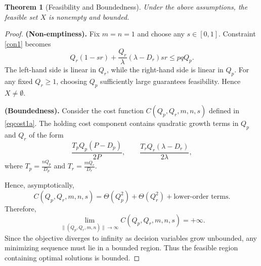 \documentclass[10pt,a4paper]{amsart}
\newtheorem{theorem}{Theorem}
\begin{document}
\begin{theorem}[Feasibility and Boundedness]\label{theorem1}
Under the above assumptions, the feasible set $X$ is nonempty and bounded.
\end{theorem}

\begin{proof}
\textbf{(Non-emptiness).}
Fix $m=n=1$ and choose any $s\in[0,1]$.
Constraint \eqref{con1} becomes
\[
Q_r(1-sr) + \frac{Q_r}{\lambda}(\lambda-D_r)sr \le pqQ_p.
\]
The left-hand side is linear in $Q_r$, while the right-hand side
is linear in $Q_p$. For any fixed $Q_r\ge1$, choosing $Q_p$
sufficiently large guarantees feasibility. Hence $X\neq\emptyset$.

\medskip

\textbf{(Boundedness).}
Consider the cost function $C(Q_p,Q_r,m,n,s)$ defined in \eqref{eqcost1a}.
The holding cost component contains quadratic growth terms in $Q_p$
and $Q_r$ of the form
\[
\frac{T_pQ_p(P-D_p)}{2P}, \qquad
\frac{T_rQ_r(\lambda-D_r)}{2\lambda},
\]
where $T_p = \frac{nQ_p}{D_p}$ and $T_r = \frac{mQ_r}{D_r}$.

Hence, asymptotically,
\[
C(Q_p,Q_r,m,n,s)
= \Theta(Q_p^2) + \Theta(Q_r^2) + \text{lower-order terms}.
\]
Therefore,
\[
\lim_{\|(Q_p,Q_r,m,n)\|\to\infty} C(Q_p,Q_r,m,n,s) = +\infty.
\]
Since the objective diverges to infinity as decision variables
grow unbounded, any minimizing sequence must lie in a bounded region.
Thus the feasible region containing optimal solutions is bounded.
\end{proof}
\end{document}
